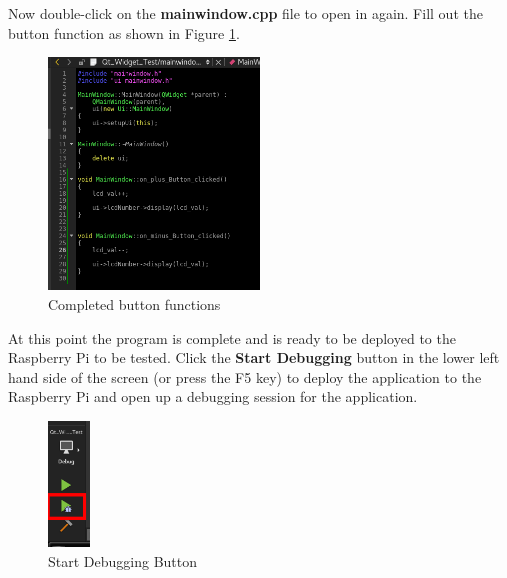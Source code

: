 \documentclass{article}
\begin{document}
Now double-click on the \textbf{mainwindow.cpp} file to open in again. Fill out the button function as shown in Figure \ref{Complete_Button_Functions}.

	\begin{figure}[H]
		\centering
		\includegraphics[width=0.5\textwidth]{pics/Complete_Button_Functions.png}
		\caption{Completed button functions}
		\label{Complete_Button_Functions}
	\end{figure}

At this point the program is complete and is ready to be deployed to the Raspberry Pi to be tested. Click the \textbf{Start Debugging} button in the lower left hand side of the screen (or press the F5 key) to deploy the application to the Raspberry Pi and open up a debugging session for the application.

	\begin{figure}[H]
		\centering
		\includegraphics[width=0.1\textwidth]{pics/Start_Debug_Button.png}
		\caption{Start Debugging Button}
		\label{Start_Debug_Button}
	\end{figure}







	
	







\end{document}
